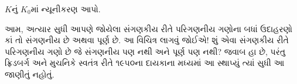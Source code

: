 \documentclass[../../../include/open-logic-section]{subfiles}
\begin{document}
\begin{prob}
$K$નું $K_0$માં ન્યૂનીકરણ આપો.
\end{prob}

\begin{digress}
આમ, અત્યાર સુધી આપણે જોયેલા સંગણકીય રીતે પરિગણનીય ગણોના
બધાં ઉદાહરણો કાં તો સંગણનીય છે અથવા પૂર્ણ છે. આ વિચિત્ર
લાગવું જોઈએ!{} શું એવા સંગણકીય રીતે પરિગણનીય ગણો છે જે
સંગણનીય પણ નથી અને પૂર્ણ પણ નથી? જવાબ હા છે, પરંતુ
ફ્રિડબર્ગ અને મુચનિકે સ્વતંત્ર રીતે ૧૯૫૦ના દાયકાના મધ્યમાં
આ સ્થાપ્યું ત્યાં સુધી આ જાણીતું નહોતું.
\end{digress}
\end{document}
